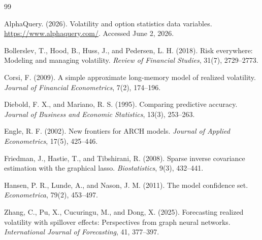 \documentclass[11pt,a4paper]{article}
\begin{document}
\begingroup
\footnotesize
\begin{thebibliography}{99}
\setlength{\itemsep}{0pt}
\setlength{\parskip}{0pt}

AlphaQuery. (2026).
Volatility and option statistics data variables.
\url{https://www.alphaquery.com/}.
Accessed June 2, 2026.

Bollerslev, T., Hood, B., Huss, J., and Pedersen, L. H. (2018).
Risk everywhere: Modeling and managing volatility.
\emph{Review of Financial Studies}, 31(7), 2729--2773.

Corsi, F. (2009).
A simple approximate long-memory model of realized volatility.
\emph{Journal of Financial Econometrics}, 7(2), 174--196.

Diebold, F. X., and Mariano, R. S. (1995).
Comparing predictive accuracy.
\emph{Journal of Business and Economic Statistics}, 13(3), 253--263.

Engle, R. F. (2002).
New frontiers for ARCH models.
\emph{Journal of Applied Econometrics}, 17(5), 425--446.

Friedman, J., Hastie, T., and Tibshirani, R. (2008).
Sparse inverse covariance estimation with the graphical lasso.
\emph{Biostatistics}, 9(3), 432--441.

Hansen, P. R., Lunde, A., and Nason, J. M. (2011).
The model confidence set.
\emph{Econometrica}, 79(2), 453--497.

Zhang, C., Pu, X., Cucuringu, M., and Dong, X. (2025).
Forecasting realized volatility with spillover effects: Perspectives from graph neural networks.
\emph{International Journal of Forecasting}, 41, 377--397.

\end{thebibliography}
\endgroup
\end{document}
